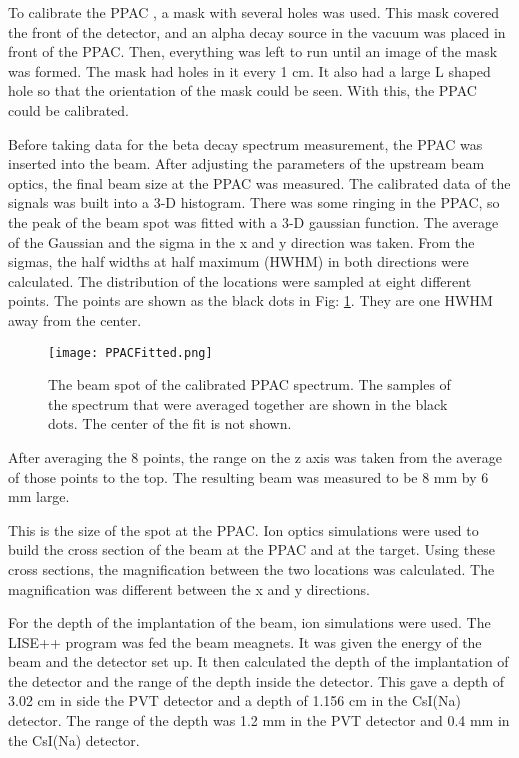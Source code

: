 \documentclass[main.tex]{subfiles}
\begin{document}
To calibrate the PPAC , a mask with several holes was used. 
This mask covered the front of the detector, and an alpha decay source in the vacuum was placed in front of the PPAC.
Then, everything was left to run until an image of the mask was formed.
The mask had holes in it every 1 cm. 
It also had a large L shaped hole so that the orientation of the mask could be seen. 
With this, the PPAC could be calibrated.

Before taking data for the beta decay spectrum measurement, the PPAC was inserted into the beam.
After adjusting the parameters of the upstream beam optics, the final beam size at the PPAC was measured.
The calibrated data of the signals was built into a 3-D histogram.
There was some ringing in the PPAC, so the peak of the beam spot was fitted with a 3-D gaussian function.
The average of the Gaussian and the sigma in the x and y direction was taken. 
From the sigmas, the half widths at half maximum (HWHM) in both directions were calculated. 
The distribution of the locations were sampled at eight different points. 
The points are shown as the black dots in Fig: \ref{fig:PPACSpotch}.
They are one HWHM away from the center. 

\begin{figure}
	\centerline{\texttt{[image: PPACFitted.png]}}
	\caption{The beam spot of the calibrated PPAC spectrum. 
		 The samples of the spectrum that were averaged together are shown in the black dots.
		 The center of the fit is not shown.}
	\label{fig:PPACSpotch}
\end{figure}  

After averaging the 8 points, the range on the z axis was taken from the average of those points to the top.
The resulting beam was measured to be 8 mm by 6 mm large.

This is the size of the spot at the PPAC. 
Ion optics simulations were used to build the cross section of the beam at the PPAC and at the target.
Using these cross sections, the magnification between the two locations was calculated.
The magnification was different between the x and y directions.

For the depth of the implantation of the beam, ion simulations were used. 
The LISE++ program was fed the beam meagnets. It was given the energy of the beam and the detector set up. 
It then calculated the depth of the implantation of the detector and the range of the depth inside the detector. 
This gave a depth of 3.02 cm in side the PVT detector and a depth of 1.156 cm in the CsI(Na) detector. 
The range of the depth was 1.2 mm in the PVT detector and 0.4 mm in the CsI(Na) detector.
\end{document}
